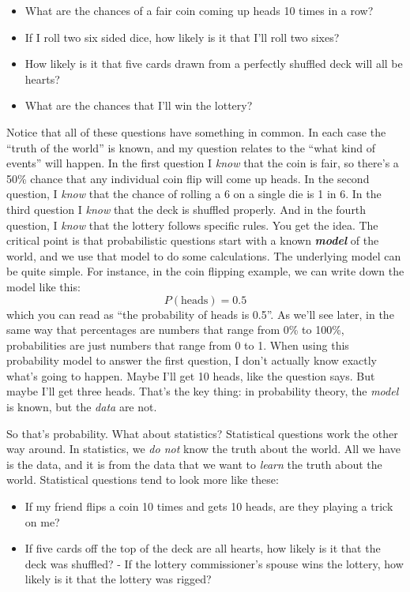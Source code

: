 \documentclass[
]{book}
\providecommand{\tightlist}{%
  \setlength{\itemsep}{0pt}\setlength{\parskip}{0pt}}
\begin{document}
\begin{itemize}
\tightlist
\item
  What are the chances of a fair coin coming up heads 10 times in a row?
\item
  If I roll two six sided dice, how likely is it that I'll roll two sixes?
\item
  How likely is it that five cards drawn from a perfectly shuffled deck will all be hearts?
\item
  What are the chances that I'll win the lottery?
\end{itemize}

Notice that all of these questions have something in common. In each case the ``truth of the world'' is known, and my question relates to the ``what kind of events'' will happen. In the first question I \emph{know} that the coin is fair, so there's a 50\% chance that any individual coin flip will come up heads. In the second question, I \emph{know} that the chance of rolling a 6 on a single die is 1 in 6. In the third question I \emph{know} that the deck is shuffled properly. And in the fourth question, I \emph{know} that the lottery follows specific rules. You get the idea. The critical point is that probabilistic questions start with a known \textbf{\emph{model}} of the world, and we use that model to do some calculations. The underlying model can be quite simple. For instance, in the coin flipping example, we can write down the model like this:
\[
P(\mbox{heads}) = 0.5
\]
which you can read as ``the probability of heads is 0.5''. As we'll see later, in the same way that percentages are numbers that range from 0\% to 100\%, probabilities are just numbers that range from 0 to 1. When using this probability model to answer the first question, I don't actually know exactly what's going to happen. Maybe I'll get 10 heads, like the question says. But maybe I'll get three heads. That's the key thing: in probability theory, the \emph{model} is known, but the \emph{data} are not.

So that's probability. What about statistics? Statistical questions work the other way around. In statistics, we \emph{do not} know the truth about the world. All we have is the data, and it is from the data that we want to \emph{learn} the truth about the world. Statistical questions tend to look more like these:

\begin{itemize}
\tightlist
\item
  If my friend flips a coin 10 times and gets 10 heads, are they playing a trick on me?
\item
  If five cards off the top of the deck are all hearts, how likely is it that the deck was shuffled? - If the lottery commissioner's spouse wins the lottery, how likely is it that the lottery was rigged?
\end{itemize}
\end{document}
